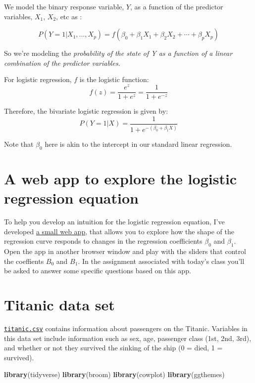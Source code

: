 \documentclass[]{book}
\newenvironment{Shaded}{\begin{snugshade}}{\end{snugshade}}
\newcommand{\KeywordTok}[1]{\textcolor[rgb]{0.13,0.29,0.53}{\textbf{#1}}}
\newcommand{\NormalTok}[1]{#1}
\theoremstyle{definition}
\theoremstyle{definition}
\theoremstyle{definition}
\theoremstyle{remark}
\begin{document}
We model the binary response variable, \(Y\), as a function of the
predictor variables, \(X_1\), \(X_2\), etc as :

\[
P(Y = 1|X_1,\ldots,X_p) = f(\beta_0 + \beta_1 X_1 + \beta_2 X_2 + \cdots + \beta_p X_p)
\]

So we're modeling the \emph{probability of the state of Y as a function
of a linear combination of the predictor variables}.

For logistic regression, \(f\) is the logistic function: \[
f(z) = \frac{e^z}{1+e^z} = \frac{1}{1 + e^{-z}}
\]

Therefore, the bivariate logistic regression is given by: \[
P(Y = 1|X) = \frac{1}{1 + e^{-(\beta_0 + \beta_1 X)}}
\]

Note that \(\beta_0\) here is akin to the intercept in our standard
linear regression.

\hypertarget{a-web-app-to-explore-the-logistic-regression-equation}{%
\section{A web app to explore the logistic regression
equation}\label{a-web-app-to-explore-the-logistic-regression-equation}}

To help you develop an intuition for the logistic regression equation,
I've developed
\href{https://magwenelab.shinyapps.io/exploring_logistic_regression/}{a
small web app}, that allows you to explore how the shape of the
regression curve responds to changes in the regression coefficients
\(\beta_0\) and \(\beta_1\). Open the app in another browser window and
play with the sliders that control the coeffients \(B_0\) and \(B_1\).
In the assignment associated with today's class you'll be asked to
answer some specific questions based on this app.

\hypertarget{titanic-data-set}{%
\section{Titanic data set}\label{titanic-data-set}}

\href{http://bit.ly/bio304-titanic-data}{\texttt{titanic.csv}} contains
information about passengers on the Titanic. Variables in this data set
include information such as sex, age, passenger class (1st, 2nd, 3rd),
and whether or not they survived the sinking of the ship (0 = died, 1 =
survived).

\begin{Shaded}
\begin{Highlighting}[]
\KeywordTok{library}\NormalTok{(tidyverse)}
\KeywordTok{library}\NormalTok{(broom)}
\KeywordTok{library}\NormalTok{(cowplot)}
\KeywordTok{library}\NormalTok{(ggthemes)}
\end{Highlighting}
\end{Shaded}
\end{document}
